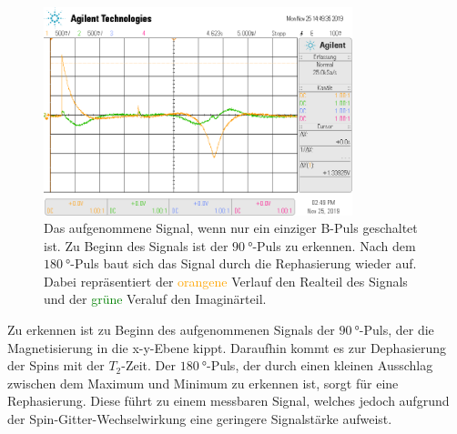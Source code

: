\begin{figure}[H]
  \centering
  \includegraphics[width=0.8\textwidth]{../data/scope_77.png}
  \caption{Das aufgenommene Signal, wenn nur ein einziger B-Puls geschaltet ist. Zu Beginn des Signals ist der
  $\SI{90}{\degree}$-Puls zu erkennen. Nach dem $\SI{180}{\degree}$-Puls baut sich das Signal durch die Rephasierung
  wieder auf. Dabei repräsentiert der \textcolor{orange}{orangene}
  Verlauf den Realteil des Signals und der \textcolor{green}{grüne} Veraluf den Imaginärteil.}
  \label{fig:N1}
\end{figure} \noindent
Zu erkennen ist zu Beginn des aufgenommenen Signals der $\SI{90}{\degree}$-Puls, der die Magnetisierung in die x-y-Ebene kippt.
Daraufhin kommt es zur Dephasierung der Spins mit der $T_2$-Zeit. Der $\SI{180}{\degree}$-Puls, der durch einen kleinen Ausschlag
zwischen dem Maximum und Minimum zu erkennen ist, sorgt für eine Rephasierung. Diese führt zu einem messbaren Signal, welches
jedoch aufgrund der Spin-Gitter-Wechselwirkung eine geringere Signalstärke aufweist.

